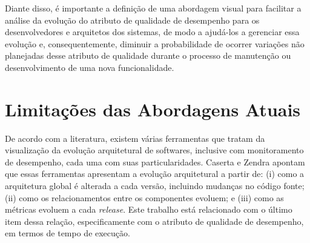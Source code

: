 



Diante disso, é importante a definição de uma abordagem visual para facilitar a análise da evolução do atributo de qualidade de desempenho para os desenvolvedores e arquitetos dos sistemas, de modo a ajudá-los a gerenciar essa evolução e, consequentemente, diminuir a probabilidade de ocorrer variações não planejadas desse atributo de qualidade durante o processo de manutenção ou desenvolvimento de uma nova funcionalidade.

\section{Limitações das Abordagens Atuais} \label{sec:limitacao-abordagens-atuais}

De acordo com a literatura, existem várias ferramentas que tratam da visualização da evolução arquitetural de softwares, inclusive com monitoramento de desempenho, cada uma com suas particularidades. Caserta e Zendra \cite{Caserta2011} apontam que essas ferramentas apresentam a evolução arquitetural a partir de: (i) como a arquitetura global é alterada a cada versão, incluindo mudanças no código fonte; (ii) como os relacionamentos entre os componentes evoluem; e (iii) como as métricas evoluem a cada \textit{release}. Este trabalho está relacionado com o último item dessa relação, especificamente com o atributo de qualidade de desempenho, em termos de tempo de execução.

